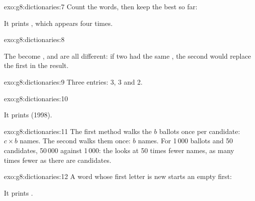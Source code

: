 \begin{solution}{exo:g8:dictionaries:7}
Count the words, then keep the best so far:

\label{lst:g8:dictionaries:sol-frequent}

It prints , which appears four times.
\end{solution}

\begin{solution}{exo:g8:dictionaries:8}
\label{lst:g8:dictionaries:sol-invert}

The  become , and  are all different: if two  had the same
, the second  would replace the first in the result.
\end{solution}

\begin{solution}{exo:g8:dictionaries:9}
Three entries:  3,  3 and  2.
\end{solution}

\begin{solution}{exo:g8:dictionaries:10}
\label{lst:g8:dictionaries:sol-oldest}

It prints  (1998).
\end{solution}

\begin{solution}{exo:g8:dictionaries:11}
The first method walks the $b$ ballots once per candidate: $c \times b$ names.
The second walks them once: $b$ names. For 1\,000 ballots and 50 candidates,
50\,000 against 1\,000: the  looks at 50 times fewer names, as
many times fewer as there are candidates.
\end{solution}

\begin{solution}{exo:g8:dictionaries:12}
A word whose first letter is new starts an empty  first:

\label{lst:g8:dictionaries:sol-group}

It prints .
\end{solution}

